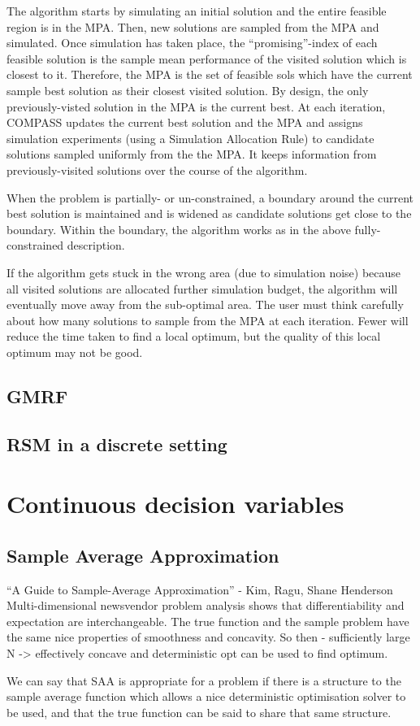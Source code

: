 \documentclass{article}
\begin{document}
The algorithm starts by simulating an initial solution and the entire feasible region is in the MPA. Then, new solutions are sampled from the MPA and simulated. Once simulation has taken place, the ``promising''-index of each feasible solution is the sample mean performance of the visited solution which is closest to it. Therefore, the MPA is the set of feasible sols which have the current sample best solution as their closest visited solution. By design, the only previously-visted solution in the MPA is the current best. At each iteration, COMPASS updates the current best solution and the MPA and assigns simulation experiments (using a Simulation Allocation Rule) to candidate solutions sampled uniformly from the the MPA. It keeps information from previously-visited solutions over the course of the algorithm.   \newline

When the problem is partially- or un-constrained, a boundary around the current best solution is maintained and is widened as candidate solutions get close to the boundary. Within the boundary, the algorithm works as in the above fully-constrained description. \newline

If the algorithm gets stuck in the wrong area (due to simulation noise) because all visited solutions are allocated further simulation budget, the algorithm will eventually move away from the sub-optimal area. The user must think carefully about how many solutions to sample from the MPA at each iteration. Fewer will reduce the time taken to find a local optimum, but the quality of this local optimum may not be good. 

\subsection{GMRF}

\subsection{RSM in a discrete setting}

\section{Continuous decision variables}

\subsection{Sample Average Approximation}

``A Guide to Sample-Average Approximation'' - Kim, Ragu, Shane Henderson
Multi-dimensional newsvendor problem analysis shows that differentiability and expectation are interchangeable. The true function and the sample problem have the same nice properties of smoothness and concavity. So then - sufficiently large N -> effectively concave and deterministic opt can be used to find optimum.

We can say that SAA is appropriate for a problem if there is a structure to the sample average function which allows a nice deterministic optimisation solver to be used, and that the true function can be said to share that same structure.
\end{document}

